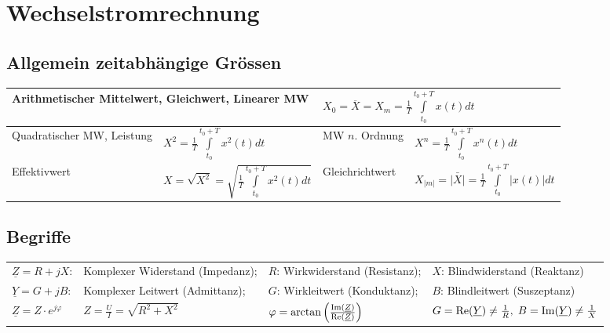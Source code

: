 \section{Wechselstromrechnung}
	\subsection{Allgemein zeitabhängige Grössen}
	\begin{tabular}{|ll|ll|}
    \hline
	\multicolumn{2}{|l}{Arithmetischer Mittelwert, Gleichwert, Linearer MW} 
	    	& \multicolumn{2}{l|}{$X_0 = \overline{X} = X_m = \frac {1} {T} \int\limits_{t_0}^{t_0+T}
	    	x(t)dt$} \\
	\hline
	Quadratischer MW, Leistung 
		& $X^2 = \frac {1} {T} \int\limits_{t_0}^{t_0+T} x^2(t)dt$ 
		& MW $n$. Ordnung
		& $X^n = \frac {1} {T} \int\limits_{t_0}^{t_0+T} x^n(t)dt$ \\
	\hline
	Effektivwert 
		& $X = \sqrt{X^2} = \sqrt{\frac{1}{T} \int\limits ^{t_0+T}_{t_0}{x^2(t)dt}}$
		& Gleichrichtwert 
		& $X_{|m|} = \bar{|X|} = \frac{1}{T} \int\limits_{t_0}^{t_0+T}{|x(t)| dt}$ \\
	\hline
   	\end{tabular}

	\subsection{Begriffe}
		\begin{tabular}{llll}
		$\underline{Z} = R +j X$: 
			& Komplexer Widerstand (Impedanz); 
			& $R$: Wirkwiderstand (Resistanz); 
			& $X$: Blindwiderstand (Reaktanz)\\
		$\underline{Y} = G + j B$: 
			& Komplexer Leitwert (Admittanz); 
			& $G$: Wirkleitwert (Konduktanz); 
			& $B$: Blindleitwert (Suszeptanz)\\
		$\underline{Z}=Z\cdot e^{j\varphi}$ & $Z=\frac{U}{I}=\sqrt{R^2+X^2}$ &
		$\varphi =
		\arctan\left(\frac{\operatorname{Im}(\underline{Z})}{\operatorname{Re}(\underline{Z})}\right)$&
		$G=\operatorname{Re}(\underline{Y})\neq\frac{1}{R}, \;
		B=\operatorname{Im}(\underline{Y})\neq\frac{1}{X}$
      	\end{tabular}
	
